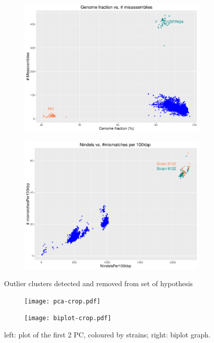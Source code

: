 \documentclass[11pt, a4paper,titlepage]{article}
\begin{document}
\begin{figure}[h]
  \begin{subfigure}{.5\textwidth}
    \centering
    \includegraphics[width=1\linewidth]{scatterplot_gfvsmis.pdf}
  \end{subfigure}%
  \begin{subfigure}{.5\textwidth}
    \centering
    \includegraphics[width=1\linewidth]{scatterplot_indels.pdf}
  \end{subfigure}
  \caption{Outlier clusters detected and removed from set of hypothesis}
  \label{fig:outliers}
\end{figure}

\begin{figure}[h]
  \begin{subfigure}{.5\textwidth}
    \centering
    \texttt{[image: pca-crop.pdf]}
  \end{subfigure}%
  \begin{subfigure}{.5\textwidth}
    \centering
    \texttt{[image: biplot-crop.pdf]}
  \end{subfigure}
  \caption{left: plot of the first 2 PC, coloured by strains; right:
    biplot graph.}
  \label{fig:pcplot}
\end{figure}
\end{document}
